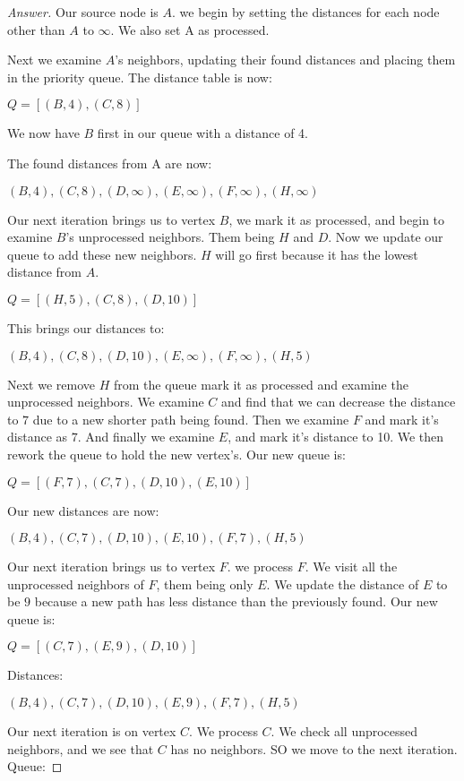 \documentclass[11pt]{article}
\theoremstyle{definition}
\theoremstyle{definition}
\theoremstyle{definition}
\begin{document}
\begin{proof}[Answer]
Our source node is $A$. we begin by setting the distances for each node other than $A$ to $\infty$. We also set A as processed. 


Next we examine $A$'s neighbors, updating their found distances and placing them in the priority queue. The distance table is now:

$Q=[(B,4),(C,8)]$

We now have $B$ first in our queue with a distance of 4.

The found distances from A are now:

$(B,4),(C,8),(D,\infty),(E,\infty),(F,\infty),(H,\infty)$

Our next iteration brings us to vertex $B$, we mark it as processed, and begin to examine $B$'s unprocessed neighbors. Them being $H$ and $D$. Now we update our queue to add these new neighbors. $H$ will go first because it has the lowest distance from $A$.

$Q=[(H,5), (C,8), (D,10)]$

This brings our distances to:

$(B,4),(C,8),(D,10),(E,\infty),(F,\infty),(H,5)$


Next we remove $H$ from the queue mark it as processed and examine the unprocessed neighbors. We examine $C$ and find that we can decrease the distance to $7$ due to a new shorter path being found. Then we examine $F$ and mark it's distance as $7$. And finally we examine $E$, and mark it's distance to 10. We then rework the queue to hold the new vertex's. Our new queue is:

$Q=[(F,7), (C,7), (D,10), (E,10)]$

Our new distances are now:

$(B,4),(C,7),(D,10),(E,10),(F,7),(H,5)$

Our next iteration brings us to vertex $F$. we process $F$. We visit all the unprocessed neighbors of $F$, them being only $E$. We update the distance of $E$ to be $9$ because a new path has less distance than the previously found. Our new queue is:

$Q=[(C,7), (E,9), (D,10)]$


Distances:

$(B,4),(C,7),(D,10),(E,9),(F,7),(H,5)$

Our next iteration is on vertex $C$. We process $C$. We check all unprocessed neighbors, and we see that $C$ has no neighbors. SO we move to the next iteration. Queue:


\end{proof}
\end{document}
